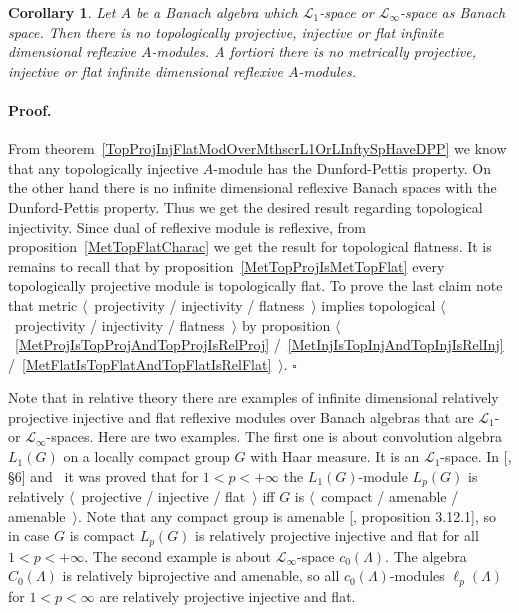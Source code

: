 \documentclass[12pt]{article}
\newtheorem{corollary}[theorem]{Corollary}
\renewenvironment{proof}{\paragraph{Proof.}}{\hfill$\square$\medskip}
\begin{document}
\begin{corollary}\label{NoInfDimRefMetTopProjInjFlatModOverMthscrL1OrLInfty} Let
    $A$ be a Banach algebra which $\mathscr{L}_1$-space or
    $\mathscr{L}_\infty$-space as Banach space. Then there is no topologically
    projective, injective or flat infinite dimensional reflexive $A$-modules. A
    fortiori there is no metrically projective, injective or flat infinite
    dimensional reflexive $A$-modules.
\end{corollary}
\begin{proof} From theorem~\ref{TopProjInjFlatModOverMthscrL1OrLInftySpHaveDPP}
    we know that any topologically injective $A$-module has the Dunford-Pettis
    property. On the other hand there is no infinite dimensional reflexive
    Banach spaces with the Dunford-Pettis property. Thus we get the desired
    result regarding topological injectivity. Since dual of reflexive module is
    reflexive, from proposition~\ref{MetTopFlatCharac} we get the result for
    topological flatness. It is remains to recall that by
    proposition~\ref{MetTopProjIsMetTopFlat}  every topologically projective
    module is topologically flat. To prove the last claim note that metric
    $\langle$~projectivity / injectivity / flatness~$\rangle$ implies
    topological $\langle$~projectivity / injectivity / flatness~$\rangle$ by
    proposition $\langle$~\ref{MetProjIsTopProjAndTopProjIsRelProj}
    /~\ref{MetInjIsTopInjAndTopInjIsRelInj}
    /~\ref{MetFlatIsTopFlatAndTopFlatIsRelFlat}~$\rangle$.
\end{proof}

Note that in relative theory there are examples of infinite dimensional
relatively projective injective and flat reflexive modules over Banach algebras
that are $\mathscr{L}_1$- or $\mathscr{L}_\infty$-spaces. Here are two examples.
The first one is about convolution algebra $L_1(G)$ on a locally compact group
$G$ with Haar measure. It is an $\mathscr{L}_1$-space.
In [\cite{DalPolHomolPropGrAlg}, \S6] and~\cite{RachInjModAndAmenGr} it
was proved that for $1<p<+\infty$ the $L_1(G)$-module $L_p(G)$ is relatively
$\langle$~projective / injective / flat~$\rangle$ iff $G$ is 
$\langle$~compact / amenable / amenable~$\rangle$. 
Note that any compact group is amenable 
[\cite{PierAmenLCA}, proposition 3.12.1], so in case $G$ is
compact $L_p(G)$ is relatively projective injective and flat for all
$1<p<+\infty$.  The second example is about $\mathscr{L}_\infty$-space
$c_0(\Lambda)$. The algebra $C_0(\Lambda)$ is relatively biprojective and
amenable, so all $c_0(\Lambda)$-modules $\ell_p(\Lambda)$ for
$1<p<\infty$ are relatively projective injective and flat.



\end{document}
